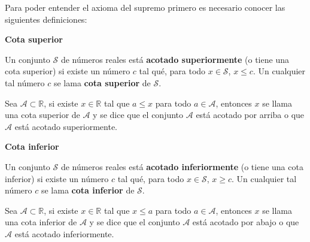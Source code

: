 \newpage
Para poder entender el axioma del supremo primero es necesario conocer las siguientes definiciones:


\vspace{0.21cm}

\begin{tcolorbox}
	\begin{defi}\textbf{Cota superior}\end{defi}
	Un conjunto $\mathcal{S}$ de números reales está \textbf{acotado superiormente} (o tiene una cota superior) si existe un número $c$ tal qué, para todo $x \in \mathcal{S}$, $x \leq c$. Un cualquier tal número $c$ se lama \textbf{cota superior} de $\mathcal{S}$. \cite{haaser}
	
\vspace{0.5cm}
Sea $\mathcal{A} \subset \mathbb{R}$, si existe $x \in \mathbb{R}$ tal que  $a \leq x$ para todo $a \in \mathcal{A}$, entonces $x$ se llama una cota superior de $\mathcal{A}$ y se dice que el conjunto $\mathcal{A}$ está acotado por arriba o que $\mathcal{A}$ está acotado superiormente. \cite{zill}
\end{tcolorbox}

\vspace{0.21cm}
\begin{tcolorbox}
	\begin{defi}\textbf{Cota inferior}\end{defi}
	Un conjunto $\mathcal{S}$ de números reales está \textbf{acotado inferiormente} (o tiene una cota inferior) si existe un número $c$ tal qué, para todo $x \in \mathcal{S}$, $x \geq c$. Un cualquier tal número $c$ se lama \textbf{cota inferior} de $\mathcal{S}$.
	
\vspace{0.5cm}
Sea $\mathcal{A} \subset \mathbb{R}$, si existe $x \in \mathbb{R}$ tal que  $x \leq a$ para todo $a \in \mathcal{A}$, entonces $x$ se llama una cota inferior de $\mathcal{A}$ y se dice que el conjunto $\mathcal{A}$ está acotado por abajo o que $\mathcal{A}$ está acotado inferiormente. \cite{zill}
\end{tcolorbox}

